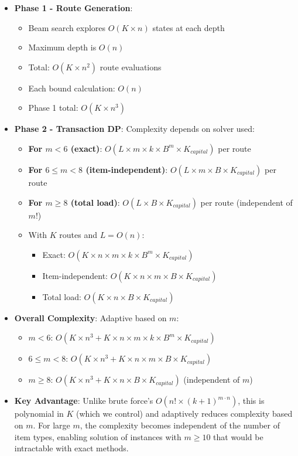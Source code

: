 \documentclass[12pt]{article}
\begin{document}
\begin{itemize}
    \item \textbf{Phase 1 - Route Generation}: 
    \begin{itemize}
        \item Beam search explores $O(K \times n)$ states at each depth
        \item Maximum depth is $O(n)$
        \item Total: $O(K \times n^2)$ route evaluations
        \item Each bound calculation: $O(n)$
        \item Phase 1 total: $O(K \times n^3)$
    \end{itemize}
    
    \item \textbf{Phase 2 - Transaction DP}: Complexity depends on solver used:
    \begin{itemize}
        \item \textbf{For $m < 6$ (exact)}: $O(L \times m \times k \times B^m \times K_{capital})$ per route
        \item \textbf{For $6 \leq m < 8$ (item-independent)}: $O(L \times m \times B \times K_{capital})$ per route
        \item \textbf{For $m \geq 8$ (total load)}: $O(L \times B \times K_{capital})$ per route (independent of $m$!)
        \item With $K$ routes and $L = O(n)$: 
        \begin{itemize}
            \item Exact: $O(K \times n \times m \times k \times B^m \times K_{capital})$
            \item Item-independent: $O(K \times n \times m \times B \times K_{capital})$
            \item Total load: $O(K \times n \times B \times K_{capital})$
        \end{itemize}
    \end{itemize}
    
    \item \textbf{Overall Complexity}: Adaptive based on $m$:
    \begin{itemize}
        \item $m < 6$: $O(K \times n^3 + K \times n \times m \times k \times B^m \times K_{capital})$
        \item $6 \leq m < 8$: $O(K \times n^3 + K \times n \times m \times B \times K_{capital})$
        \item $m \geq 8$: $O(K \times n^3 + K \times n \times B \times K_{capital})$ (independent of $m$)
    \end{itemize}
    
    \item \textbf{Key Advantage}: Unlike brute force's $O(n! \times (k+1)^{m \cdot n})$, this is polynomial in $K$ (which we control) and adaptively reduces complexity based on $m$. For large $m$, the complexity becomes independent of the number of item types, enabling solution of instances with $m \geq 10$ that would be intractable with exact methods.
\end{itemize}
\end{document}
